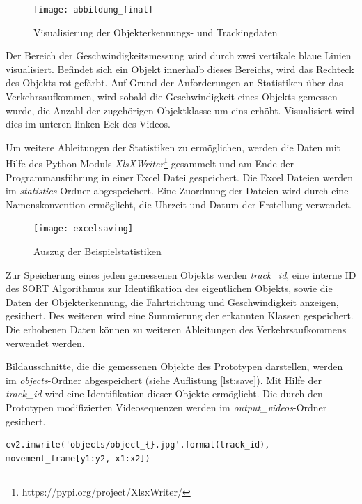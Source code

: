 \begin{figure}[htb]
	\centering
	\texttt{[image: abbildung\_final]}
	\caption{Visualisierung der Objekterkennungs- und Trackingdaten}
	\label{fig:visual}
\end{figure}

Der Bereich der Geschwindigkeitsmessung wird durch zwei vertikale blaue Linien visualisiert. Befindet sich ein Objekt innerhalb dieses Bereichs, wird das Rechteck des Objekts rot gefärbt. Auf Grund der Anforderungen an Statistiken über das Verkehrsaufkommen, wird sobald die Geschwindigkeit eines Objekts gemessen wurde, die Anzahl der zugehörigen Objektklasse um eins erhöht. Visualisiert wird dies im unteren linken Eck des Videos. 

Um weitere Ableitungen der Statistiken zu ermöglichen, werden die Daten mit Hilfe des Python Moduls \emph{XlsXWriter}\footnote{https://pypi.org/project/XlsxWriter/} gesammelt und am Ende der Programmausführung in einer Excel Datei gespeichert. Die Excel Dateien werden im \emph{statistics}-Ordner abgespeichert. Eine Zuordnung der Dateien wird durch eine Namenskonvention ermöglicht, die Uhrzeit und Datum der Erstellung verwendet. 

\begin{figure}[htb]
	\centering
	\texttt{[image: excelsaving]}
	\caption{Auszug der Beispielstatistiken}
	\label{fig:excelsaving}
\end{figure}

Zur Speicherung eines jeden gemessenen Objekts werden \emph{track\_id}, eine interne ID des \ac{SORT} Algorithmus zur Identifikation des eigentlichen Objekts, sowie die Daten der Objekterkennung, die Fahrtrichtung und Geschwindigkeit anzeigen, gesichert. Des weiteren wird eine Summierung der erkannten Klassen gespeichert. Die erhobenen Daten können zu weiteren Ableitungen des Verkehrsaufkommens verwendet werden. 

Bildausschnitte, die die gemessenen Objekte des Prototypen darstellen, werden im \emph{objects}-Ordner abgespeichert (siehe Auflistung \ref{lst:save}). Mit Hilfe der \emph{track\_id} wird eine Identifikation dieser Objekte ermöglicht. Die durch den Prototypen modifizierten Videosequenzen werden im \emph{output\_videos}-Ordner gesichert.

\vspace*{5mm}
\begin{lstlisting}[caption={Speichern eines Bildausschnittes}, label={lst:save}]
cv2.imwrite('objects/object_{}.jpg'.format(track_id), movement_frame[y1:y2, x1:x2])
\end{lstlisting}




